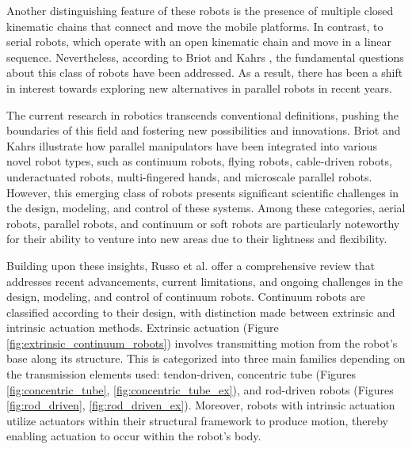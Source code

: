 \par Another distinguishing feature of these robots is the presence of multiple closed kinematic chains that connect and move the mobile platforms. In contrast, to serial robots, which operate with an open kinematic chain and move in a linear sequence. Nevertheless, according to Briot and Kahrs \cite{briot2023}, the fundamental questions about this class of robots have been addressed. As a result, there has been a shift in interest towards exploring new alternatives in parallel robots in recent years.

\par The current research in robotics transcends conventional definitions, pushing the boundaries of this field and fostering new possibilities and innovations. Briot and Kahrs \cite{briot2023} illustrate how parallel manipulators have been integrated into various novel robot types, such as continuum robots, flying robots, cable-driven robots, underactuated robots, multi-fingered hands, and microscale parallel robots. However, this emerging class of robots presents significant scientific challenges in the design, modeling, and control of these systems. Among these categories, aerial robots, parallel robots, and continuum or soft robots are particularly noteworthy for their ability to venture into new areas due to their lightness and flexibility.

\par Building upon these insights, Russo et al. \cite{russo2023} offer a comprehensive review that addresses recent advancements, current limitations, and ongoing challenges in the design, modeling, and control of continuum robots. Continuum robots are classified according to their design, with distinction made between extrinsic and intrinsic actuation methods. Extrinsic actuation (Figure \ref{fig:extrinsic_continuum_robots}) involves transmitting motion from the robot's base along its structure. This is categorized into three main families depending on the transmission elements used: tendon-driven, concentric tube (Figures \ref{fig:concentric_tube}, \ref{fig:concentric_tube_ex}), and rod-driven robots (Figures \ref{fig:rod_driven}, \ref{fig:rod_driven_ex}). Moreover, robots with intrinsic actuation utilize actuators within their structural framework to produce motion, thereby enabling actuation to occur within the robot's body.

